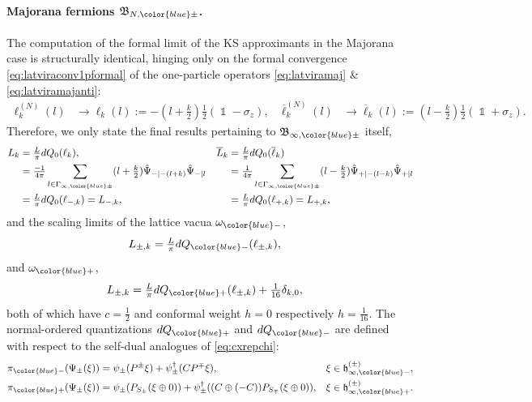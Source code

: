 \documentclass[a4paper, 11pt]{article}
\newcommand{\fB}{\mathfrak{B}}\newcommand{\cB}{\mathcal{B}}\newcommand{\dB}{\mathds{B}}\newcommand{\sB}{\mathscr{B}}
\newcommand{\fh}{\mathfrak{h}}
\DeclareMathOperator{\1}{\mathds{1}}
\begin{document}
\paragraph{Majorana fermions $\fB_{N,{\color{blue}\pm}}$.} The computation of the formal limit of the KS approximants in the Majorana case is structurally identical, hinging only on the formal convergence \eqref{eq:latviraconv1pformal} of the one-particle operators \eqref{eq:latviramaj} \& \eqref{eq:latviramajanti}:
\begin{align}
\label{eq:scalelim1pviramaj}
 \ell^{(N)}_{k}(l) & \rightarrow \ell_{k}(l) := -(l+\tfrac{k}{2})\tfrac{1}{2}(\1-\sigma_{z}), & \overline{\ell}^{(N)}_{k}(l) & \rightarrow \overline{\ell}_{k}(l) := (l-\tfrac{k}{2})\tfrac{1}{2}(\1+\sigma_{z}).
\end{align}
Therefore, we only state the final results pertaining to $\fB_{\infty,{\color{blue}\pm}}$ itself,
\begin{align}
\label{eq:scalelimviramaj}
L_{k} & = \tfrac{L}{\pi}dQ_{0}(\ell_{k}), & \overline{L}_{k} & = \tfrac{L}{\pi}dQ_{0}(\overline{\ell}_{k})  \\ \nonumber
 & = \tfrac{-1}{4\pi}\sum_{l\in\Gamma_{\infty,{\color{blue}\pm}}}(l+\tfrac{k}{2})\hat{\Psi}_{-|-(l+k)}\hat{\Psi}_{-|l} &  & = \tfrac{1}{4\pi}\sum_{l\in\Gamma_{\infty,{\color{blue}\pm}}}(l-\tfrac{k}{2})\hat{\Psi}_{+|-(l-k)}\hat{\Psi}_{+|l} \\ \nonumber
 & = \tfrac{L}{\pi}dQ_{0}(\ell_{-,k}) = L_{-,k}, &  & = \tfrac{L}{\pi}dQ_{0}(\ell_{+,k}) = L_{+,k},
\end{align}
and the scaling limits of the lattice vacua $\omega_{{\color{blue}-}}$,
\begin{align}
\label{eq:scalelimviramajNS}
L_{\pm, k} & = \tfrac{L}{\pi}dQ_{{\color{blue}-}}(\ell_{\pm, k}),
\end{align}
and $\omega_{{\color{blue}+}}$,
\begin{align}
\label{eq:scalelimviramajR}
L_{\pm, k} & = \tfrac{L}{\pi}dQ_{{\color{blue}+}}(\ell_{\pm, k}) + \tfrac{1}{16}\delta_{k,0},
\end{align}
both of which have $c=\tfrac{1}{2}$ and conformal weight $h=0$ respectively $h=\tfrac{1}{16}$. The normal-ordered quantizations $dQ_{{\color{blue}+}}$ and $dQ_{{\color{blue}-}}$ are defined with respect to the self-dual analogues of \eqref{eq:cxrepchi}:
\begin{align}
\label{eq:majrepchi}
\pi_{{\color{blue}-}}(\Psi_{\pm}(\xi)) & = \psi_{\pm}(P^{\pm}\xi)+\psi^{\dag}_{\pm}(CP^{\mp}\xi), & \xi & \in\fh^{(\pm)}_{\infty,{\color{blue}-}}, \\
\label{eq:majrepchiR}
\pi_{{\color{blue}+}}(\Psi_{\pm}(\xi)) & = \psi_{\pm}(P_{S_{\pm}}(\xi\oplus0))+\psi^{\dag}_{\pm}((C\oplus (-C))P_{S_{\mp}}(\xi\oplus0)), & \xi & \in\fh^{(\pm)}_{\infty,{\color{blue}+}}.
\end{align}
\end{document}

